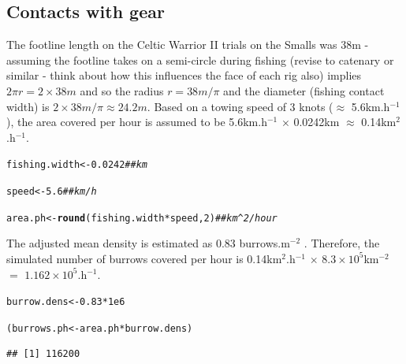 \documentclass[12pt]{article}\usepackage[]{graphicx}\usepackage[]{color}
\makeatletter
\newcommand{\hlnum}[1]{\textcolor[rgb]{0.686,0.059,0.569}{#1}}%
\newcommand{\hlcom}[1]{\textcolor[rgb]{0.678,0.584,0.686}{\textit{#1}}}%
\newcommand{\hlopt}[1]{\textcolor[rgb]{0,0,0}{#1}}%
\newcommand{\hlstd}[1]{\textcolor[rgb]{0.345,0.345,0.345}{#1}}%
\newcommand{\hlkwb}[1]{\textcolor[rgb]{0.69,0.353,0.396}{#1}}%
\newcommand{\hlkwd}[1]{\textcolor[rgb]{0.737,0.353,0.396}{\textbf{#1}}}%
\newenvironment{kframe}{%
 \def\at@end@of@kframe{}%
 \ifinner\ifhmode%
  \def\at@end@of@kframe{\end{minipage}}%
  \begin{minipage}{\columnwidth}%
 \fi\fi%
 \def\FrameCommand##1{\hskip\@totalleftmargin \hskip-\fboxsep
 \colorbox{shadecolor}{##1}\hskip-\fboxsep
     \hskip-\linewidth \hskip-\@totalleftmargin \hskip\columnwidth}%
 \MakeFramed {\advance\hsize-\width
   \@totalleftmargin\z@ \linewidth\hsize
   \@setminipage}}%
 {\par\unskip\endMakeFramed%
 \at@end@of@kframe}
\newenvironment{knitrout}{}{} %
\makeatother
\begin{document}
\subsection{Contacts with gear}
The footline length on the Celtic Warrior II trials on the Smalls was 38m - assuming the footline takes on a semi-circle during fishing (revise to catenary or similar - think about how this influences the face of each rig also) implies $2 \pi r  = 2 \times 38m$ and so the radius $r  = 38m/\pi$ and the diameter (fishing contact width) is $2 \times 38m/\pi \approx 24.2m$. Based on a towing speed of 3 knots ($\approx$ 5.6km.h$^{-1}$), the area covered per hour is assumed to be 5.6km.h$^{-1}$ $\times$ 0.0242km $\approx$ 0.14km$^2$.h$^{-1}$.

\begin{knitrout}\footnotesize
{}\color{fgcolor}\begin{kframe}
\begin{alltt}
\hlstd{fishing.width} \hlkwb{<-} \hlnum{0.0242} \hlcom{## km}

\hlstd{speed} \hlkwb{<-} \hlnum{5.6} \hlcom{## km/h}

\hlstd{area.ph} \hlkwb{<-} \hlkwd{round}\hlstd{(fishing.width} \hlopt{*} \hlstd{speed,} \hlnum{2}\hlstd{)} \hlcom{## km^2/hour}
\end{alltt}
\end{kframe}
\end{knitrout}

The adjusted mean density is estimated as 0.83 burrows.m$^{-2}$ \citep{Ligas:etal:survey:2014}. Therefore, the simulated number of burrows covered per hour is 0.14km$^2$.h$^{-1}$ $\times$ \ensuremath{8.3\times 10^{5}}km$^{-2}$ $=$ \ensuremath{1.162\times 10^{5}}.h$^{-1}$.\\ 
\begin{knitrout}\footnotesize
{}\color{fgcolor}\begin{kframe}
\begin{alltt}
\hlstd{burrow.dens} \hlkwb{<-} \hlnum{0.83} \hlopt{*} \hlnum{1e6}

\hlstd{(burrows.ph} \hlkwb{<-} \hlstd{area.ph} \hlopt{*} \hlstd{burrow.dens)}
\end{alltt}
\begin{verbatim}
## [1] 116200
\end{verbatim}
\end{kframe}
\end{knitrout}
\end{document}
